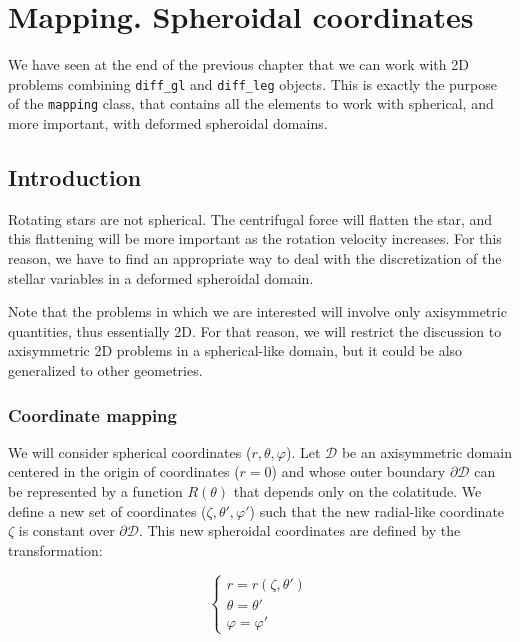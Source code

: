 \chapter{Mapping. Spheroidal coordinates}

We have seen at the end of the previous chapter that we can work with 2D problems combining {\tt diff\_gl} and
{\tt diff\_leg} objects. This is exactly the purpose of the {\tt mapping} class, that contains all the elements
to work with spherical, and more important, with deformed spheroidal domains. 

\section{Introduction}

Rotating stars are not spherical. The centrifugal force will flatten the star, and this flattening will
be more important as the rotation velocity increases. For this reason, we have to find an appropriate way
to deal with the discretization of the stellar variables in a deformed spheroidal domain.

Note that the problems in which we are interested will involve only axisymmetric quantities, thus essentially 
2D. For that reason, we will restrict the discussion to axisymmetric 2D problems in a spherical-like domain,
but it could be also generalized to other geometries.

\subsection{Coordinate mapping}
\label{sect:mapping}

We will consider spherical coordinates ($r,\theta,\varphi$). Let $\mathcal{D}$ be an axisymmetric domain centered
in the origin of coordinates ($r=0$) and whose outer boundary $\partial\mathcal{D}$
can be represented by a function $R(\theta)$ that
depends only on the colatitude. We define a new set of coordinates ($\zeta,\theta',\varphi'$) such that 
the new radial-like coordinate $\zeta$ is constant over $\partial\mathcal{D}$. This new spheroidal
coordinates are defined by the transformation:

\begin{equation}
\left\{
\begin{array}{l}
r=r(\zeta,\theta')\\
\theta=\theta'\\
\varphi=\varphi'
\end{array}
\right.
\end{equation}


